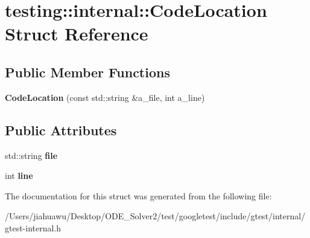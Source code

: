 \hypertarget{structtesting_1_1internal_1_1_code_location}{}\section{testing\+:\+:internal\+:\+:Code\+Location Struct Reference}
\label{structtesting_1_1internal_1_1_code_location}
\subsection*{Public Member Functions}
\begin{DoxyCompactItemize}
\item 
\mbox{\label{structtesting_1_1internal_1_1_code_location_a323a11851c81629d632c47b9b767b8ac}} 
{\bfseries Code\+Location} (const std\+::string \&a\+\_\+file, int a\+\_\+line)
\end{DoxyCompactItemize}
\subsection*{Public Attributes}
\begin{DoxyCompactItemize}
\item 
\mbox{\label{structtesting_1_1internal_1_1_code_location_a38118056ad3c11359920274e393bc6b3}} 
std\+::string {\bfseries file}
\item 
\mbox{\label{structtesting_1_1internal_1_1_code_location_a01c977c7e8834a05a6d6c40b0c416045}} 
int {\bfseries line}
\end{DoxyCompactItemize}


The documentation for this struct was generated from the following file\+:\begin{DoxyCompactItemize}
\item 
/\+Users/jiahuawu/\+Desktop/\+O\+D\+E\+\_\+\+Solver2/test/googletest/include/gtest/internal/gtest-\/internal.\+h\end{DoxyCompactItemize}
